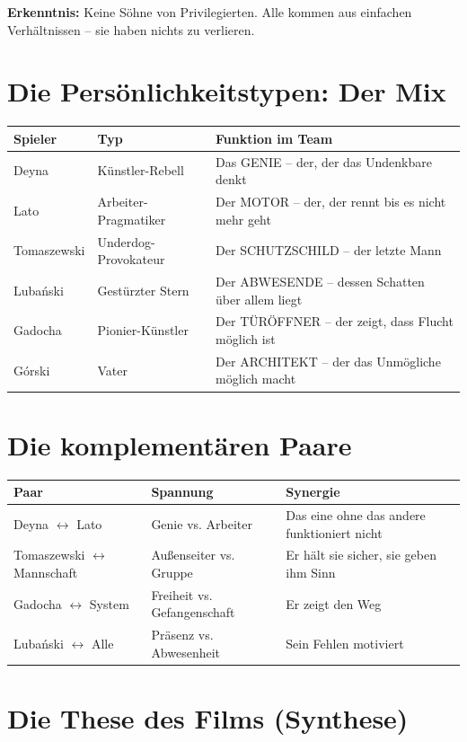 \documentclass[11pt,a4paper]{book}
\begin{document}
\textbf{Erkenntnis:} Keine Söhne von Privilegierten. Alle kommen aus einfachen Verhältnissen -- sie haben nichts zu verlieren.

\section{Die Persönlichkeitstypen: Der Mix}

\begin{longtable}{L{3cm}L{3cm}L{7cm}}
\toprule
\textbf{Spieler} & \textbf{Typ} & \textbf{Funktion im Team} \\
\midrule
\endhead
Deyna & Künstler-Rebell & Das GENIE -- der, der das Undenkbare denkt \\
Lato & Arbeiter-Pragmatiker & Der MOTOR -- der, der rennt bis es nicht mehr geht \\
Tomaszewski & Underdog-Provokateur & Der SCHUTZSCHILD -- der letzte Mann \\
Lubański & Gestürzter Stern & Der ABWESENDE -- dessen Schatten über allem liegt \\
Gadocha & Pionier-Künstler & Der TÜRÖFFNER -- der zeigt, dass Flucht möglich ist \\
Górski & Vater & Der ARCHITEKT -- der das Unmögliche möglich macht \\
\bottomrule
\end{longtable}

\section{Die komplementären Paare}

\begin{longtable}{L{4cm}L{3.5cm}L{5.5cm}}
\toprule
\textbf{Paar} & \textbf{Spannung} & \textbf{Synergie} \\
\midrule
\endhead
Deyna $\leftrightarrow$ Lato & Genie vs. Arbeiter & Das eine ohne das andere funktioniert nicht \\
Tomaszewski $\leftrightarrow$ Mannschaft & Außenseiter vs. Gruppe & Er hält sie sicher, sie geben ihm Sinn \\
Gadocha $\leftrightarrow$ System & Freiheit vs. Gefangenschaft & Er zeigt den Weg \\
Lubański $\leftrightarrow$ Alle & Präsenz vs. Abwesenheit & Sein Fehlen motiviert \\
\bottomrule
\end{longtable}

\section{Die These des Films (Synthese)}
\end{document}
